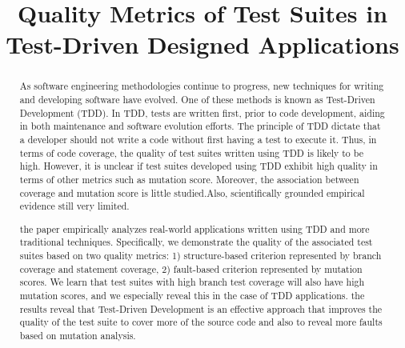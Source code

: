 \documentclass[conference]{IEEEtran}
\begin{document}
\title{Quality Metrics of Test Suites in Test-Driven Designed Applications}

\author{
\and
{}
}
\maketitle
\begin{abstract}
As software engineering methodologies continue to progress, new techniques for writing and developing software have evolved. One of these methods is known as Test-Driven Development (TDD). In TDD, tests are written first, prior to code development, aiding in both maintenance and software evolution efforts.  The principle of TDD dictate that a developer should not write a code without first having a test to execute it.  Thus, in terms of code coverage, the quality of test suites written using TDD  is likely to be high.  However, it is unclear if test suites developed using TDD exhibit high quality in terms of other metrics such as mutation score.  Moreover, the association between coverage and mutation score is little studied.Also, scientifically grounded empirical evidence still very limited.

the paper empirically analyzes real-world applications written using TDD and more traditional techniques.  Specifically, we demonstrate the quality of the associated test suites based on two quality metrics: 1) structure-based criterion represented by branch coverage and statement coverage, 2) fault-based criterion represented by mutation scores. We learn that test suites with high branch test coverage will also have high mutation scores, and we especially reveal this in the case of TDD applications. the results reveal that Test-Driven Development is an effective approach that improves the quality of the test suite to cover more of the source code and also to reveal more faults based on mutation analysis.%
 
\end{abstract}
\end{document}
